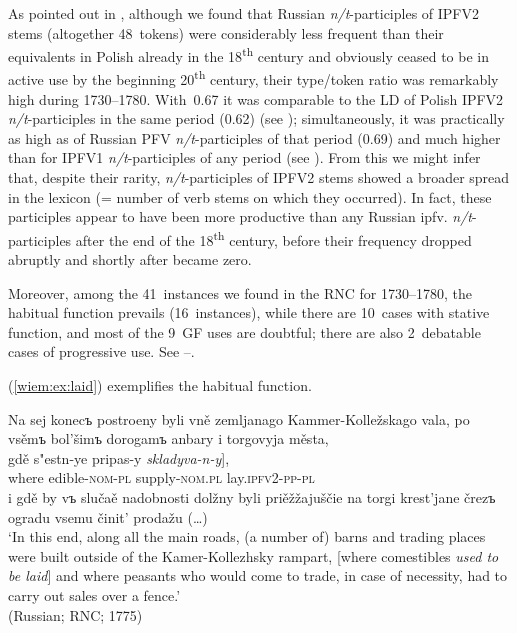 \documentclass[output=paper]{langscibook}
\begin{document}
As pointed out in , although we found that Russian \textit{n/t}-participles of IPFV2 stems (altogether 48~tokens) were considerably less frequent than their equivalents in Polish already in the 18\textsuperscript{th} century and obviously ceased to be in active use by the beginning 20\textsuperscript{th} century, their type/token ratio was remarkably high during 1730--1780. With~0.67 it was comparable to the LD of Polish IPFV2 \textit{n/t}-participles in the same period (0.62) (see ); simultaneously, it was practically as high as of Russian PFV \textit{n/t}-participles of that period (0.69) and much higher than for IPFV1 \textit{n/t}-participles of any period (see ). From this we might infer that, despite their rarity, \textit{n/t}-participles of IPFV2 stems showed a broader spread in the lexicon (= number of verb stems on which they occurred). In fact, these participles appear to have been more productive than any Russian ipfv. \textit{n/t}-participles after the end of the 18\textsuperscript{th} century, before their frequency dropped abruptly and shortly after became zero.

Moreover, among the 41~instances we found in the RNC for 1730--1780, the habitual function prevails (16~instances), while there are 10~cases with stative function, and most of the 9~GF uses are doubtful; there are also 2~debatable cases of progressive use. See 
--.

(\ref{wiem:ex:laid}) exemplifies the habitual function.

\ea\label{wiem:ex:laid}
{Na sej konecъ postroeny byli vně zemljanago Kammer-Kolležskago vala, po vsěmъ bol’šimъ 	dorogamъ anbary i torgovyja města,}\\
\gll \minsp{[} {gdě} {s"estn-ye} {pripas-y} {\textit{skladyva-n-y}}],\\
{} where edible-\textsc{nom-pl} supply-\textsc{nom.pl} lay.\textsc{ipfv2-pp-pl}\\
{i gdě by vъ slučaě 	nadobnosti dolžny byli priěžžajuščie na torgi krest’jane črezъ ogradu vsemu činit’ prodažu (…)}\\
\glt ‘In this end, along all the main roads, (a number of) barns and trading places were built outside of the Kamer-Kollezhsky rampart, [where comestibles \textit{used to be laid}] and where peasants who would come to trade, in case of necessity, had to carry out sales over a fence.’\\
\hfill (Russian; RNC; 1775)
\z
\end{document}
